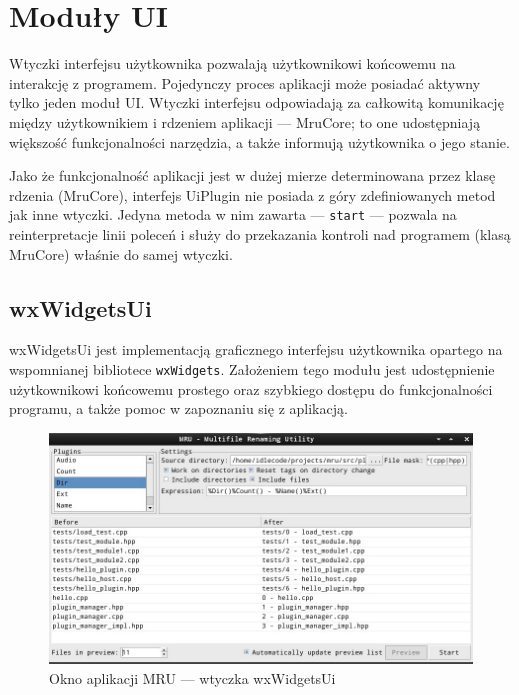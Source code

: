 \section{Moduły UI}
\par
Wtyczki interfejsu użytkownika pozwalają użytkownikowi końcowemu na interakcję z programem.
Pojedynczy proces aplikacji może posiadać aktywny tylko jeden moduł UI. 
Wtyczki interfejsu odpowiadają za całkowitą komunikację między użytkownikiem i rdzeniem aplikacji --- MruCore; to one udostępniają większość funkcjonalności narzędzia, a także informują użytkownika o jego stanie.
\par
Jako że funkcjonalność aplikacji jest w dużej mierze determinowana przez klasę rdzenia (MruCore), interfejs UiPlugin nie posiada z góry zdefiniowanych metod jak inne wtyczki. Jedyna metoda w nim zawarta --- \texttt{start} --- pozwala na reinterpretacje linii poleceń i służy do przekazania kontroli nad programem (klasą MruCore) właśnie do samej wtyczki.

\subsection{wxWidgetsUi}
\par
wxWidgetsUi jest implementacją graficznego interfejsu użytkownika opartego na wspomnianej bibliotece \texttt{wxWidgets}. Założeniem tego modułu jest udostępnienie użytkownikowi końcowemu prostego oraz szybkiego dostępu do funkcjonalności programu, a także pomoc w zapoznaniu się z aplikacją.

\begin{figure}
\begin{center}
\includegraphics[scale=0.50]{img/wxwidgetsui.png}
\end{center}
\caption{Okno aplikacji MRU --- wtyczka wxWidgetsUi}
\end{figure}

